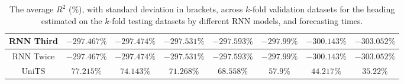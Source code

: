 \begin{table}[!ht]
{\begin{tabular}{|c|c|c|c|c|c|c|c|}
			RNN Third & $-297.467\%$ & $-297.474\%$ & $-297.531\%$ & $-297.593\%$ & $-297.99\%$ & $-300.143\%$ & $-303.052\%$ \\ \hline
			RNN Twice & $-297.467\%$ & $-297.474\%$ & $-297.531\%$ & $-297.593\%$ & $-297.99\%$ & $-300.143\%$ & $-303.052\%$ \\ \hline
			UniTS & $77.215\%$ & $74.143\%$ & $71.268\%$ & $\mathbf{68.558\%}$ & $\mathbf{57.9\%}$ & $\mathbf{44.217\%}$ & $\mathbf{35.22\%}$ \\ \hline
		\end{tabular}
	}
	\caption{The average $R^{2}$ (\%), with standard deviation in brackets, across $k$-fold validation datasets for the heading estimated on the $k$-fold testing datasets by different RNN models, and forecasting times.}
	\label{tab:all_direction_R2}
\end{table}


